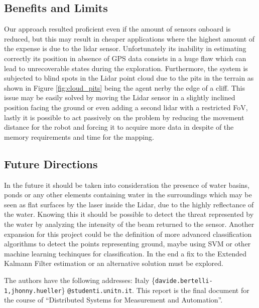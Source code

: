 \documentclass[twocolumn, a4paper]{article}
\begin{document}
\subsection{Benefits and Limits}
Our approach resulted proficient even if the amount of sensors onboard is
reduced, but this may result in cheaper applications where the highest
amount of the expense is due to the lidar sensor.
Unfortunately its inability in estimating correctly its position in absence
of GPS data consists in a huge flaw which can lead to unrecoverable states
during the exploration.
Furthermore, the system is subjected to blind spots in the Lidar point
cloud due to the pits in the terrain as shown in Figure \ref{fig:cloud_pits}
being the agent nerby the edge of a cliff.
This issue may be easily solved by moving the Lidar sensor in a slightly
inclined position facing the ground or even adding a second lidar with
a restricted FoV, lastly it is possible to act passively on the problem
by reducing the movement distance for the robot and forcing it to acquire
more data in despite of the memory requirements and time for the mapping.

\subsection{Future Directions}
In the future it should be taken into consideration the presence of water
basins, ponds or any other elements containing water in the surroundings which
may be seen as flat surfaces by the laser inside the Lidar, due to the highly
reflectance of the water. Knowing this it should be possible to detect the
threat represented by the water by analyzing the intensity of the beam
returned to the sensor.
Another expansion for this project could be the definition of more advanced
classification algorithms to detect the points representing ground, maybe
using SVM or other machine learning techinques for classification.
In the end a fix to the Extended Kalmann Filter estimation or an
alternative solution must be explored.

\vfill
\footnotesize{
    The authors have the following addresses: Italy\newline
    \small{\{\texttt{davide.bertelli-1,jhonny.hueller}\}%
             \texttt{@studenti.unitn.it}.}
    \footnotesize{
    This report is the final document for the course of “Distributed Systems
    for Measurement and Automation”.}
}

\newpage
\end{document}
